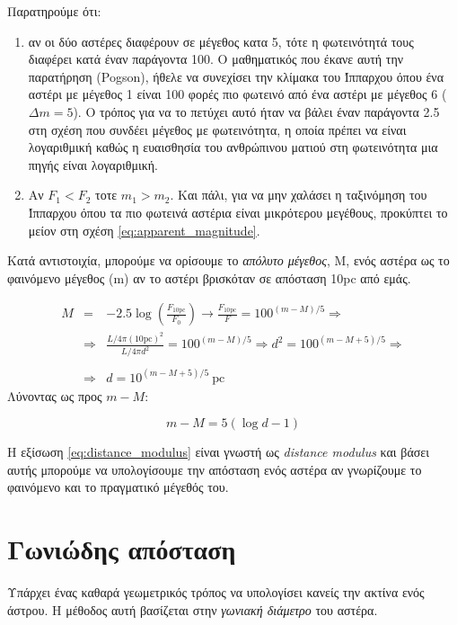 Παρατηρούμε ότι:
\begin{enumerate}
    \item αν οι δύο αστέρες διαφέρουν σε μέγεθος κατα 5, τότε η φωτεινότητά τους διαφέρει κατά έναν παράγοντα 100. Ο μαθηματικός που έκανε αυτή την παρατήρηση (Pogson), ήθελε να συνεχίσει την κλίμακα του Ίππαρχου όπου ένα αστέρι με μέγεθος 1 είναι 100 φορές πιο φωτεινό από ένα αστέρι με μέγεθος 6 ($\Delta m = 5$). Ο τρόπος για να το πετύχει αυτό ήταν να βάλει έναν παράγοντα 2.5 στη σχέση που συνδέει μέγεθος με φωτεινότητα, η οποία πρέπει να είναι λογαριθμική καθώς η ευαισθησία του ανθρώπινου ματιού στη φωτεινότητα μια πηγής είναι λογαριθμική.
    \item Αν $F_1 < F_2$ τοτε $m_1 > m_2$. Και πάλι, για να μην χαλάσει η ταξινόμηση του Ίππαρχου όπου τα πιο φωτεινά αστέρια είναι μικρότερου μεγέθους, προκύπτει το μείον στη σχέση \eqref{eq:apparent_magnitude}.
\end{enumerate}

Κατά αντιστοιχία, μπορούμε να ορίσουμε το \textit{απόλυτο μέγεθος}, M, ενός αστέρα ως το φαινόμενο μέγεθος (m) αν το αστέρι βρισκόταν σε απόσταση 10pc από εμάς.

\begin{eqnarray*}
    M &=& -2.5 \log \left( \frac{F_{10 \text{pc}}}{F_0} \right) \longrightarrow \frac{F_{10 \text{pc}}}{F} = 100^{(m-M)/5} \Rightarrow \\
    &\Rightarrow & \frac{\displaystyle L/4\pi (10 \text{pc})^2}{L/4 \pi d^2} = 100^{(m-M)/5} \Rightarrow d^2 = 100^{(m-M+5)/5} \Rightarrow \\\\
    & \Rightarrow & \boxed{d = 10^{(m-M+5)/5} \ \text{pc}}
\end{eqnarray*}
Λύνοντας ως προς $m-M$:

\begin{equation}
    \label{eq:distance_modulus}
    m-M = 5(\log d - 1)
\end{equation}

Η εξίσωση \eqref{eq:distance_modulus} είναι γνωστή ως \textit{distance modulus} και βάσει αυτής μπορούμε να υπολογίσουμε την απόσταση ενός αστέρα αν γνωρίζουμε το φαινόμενο και το πραγματικό μέγεθός του.

\section{Γωνιώδης απόσταση}
Υπάρχει ένας καθαρά γεωμετρικός τρόπος να υπολογίσει κανείς την ακτίνα ενός άστρου. Η μέθοδος αυτή βασίζεται στην \textit{γωνιακή διάμετρο} του αστέρα.

